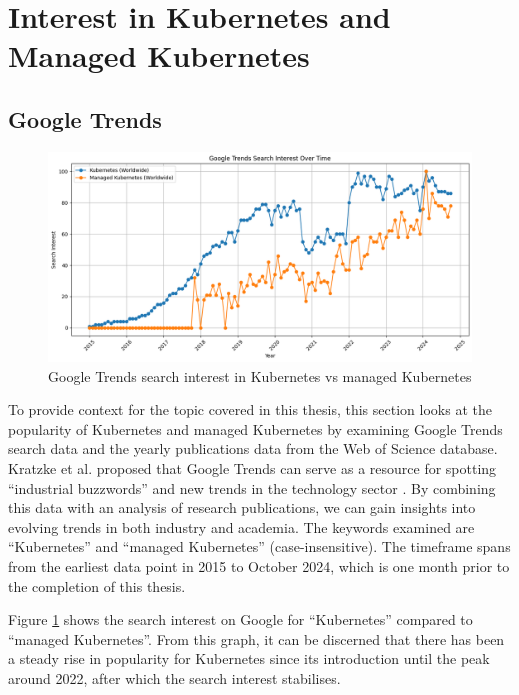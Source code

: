 \section{Interest in Kubernetes and Managed Kubernetes}

\subsection{Google Trends}

\FloatBarrier  

\begin{figure}
    \centering
    \includegraphics[width=1\linewidth]{resources/d2a89eeeda76d50039bc6f5d3a97c41b.png}
    \caption{Google Trends search interest in Kubernetes vs managed Kubernetes}
    \label{fig:search-interests-kubernetes-vs-managed-kubernetes}
\end{figure}

To provide context for the topic covered in this thesis, this section looks at the popularity of Kubernetes and managed Kubernetes by examining Google Trends search data and the yearly publications data from the Web of Science database. Kratzke et al. proposed that Google Trends can serve as a resource for spotting “industrial buzzwords” and new trends in the technology sector \cite{kratzkeUnderstandingCloudnativeApplications2017}. By combining this data with an analysis of research publications, we can gain insights into evolving trends in both industry and academia. The keywords examined are “Kubernetes” and “managed Kubernetes” (case-insensitive). The timeframe spans from the earliest data point in 2015 to October 2024, which is one month prior to the completion of this thesis.

Figure \ref{fig:search-interests-kubernetes-vs-managed-kubernetes} shows the search interest on Google for “Kubernetes” compared to “managed Kubernetes”. From this graph, it can be discerned that there has been a steady rise in popularity for Kubernetes since its introduction until the peak around 2022, after which the search interest stabilises.

